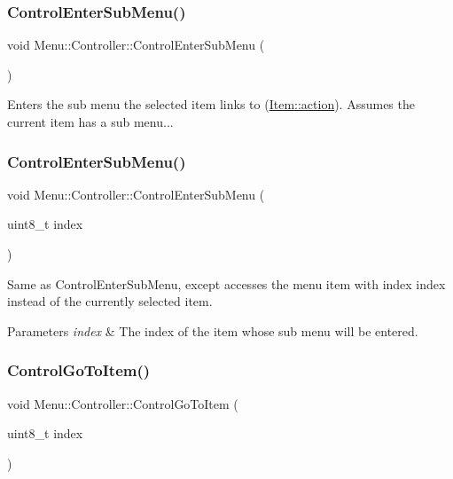 \subsubsection{\texorpdfstring{Control\+Enter\+Sub\+Menu()}{ControlEnterSubMenu()}\hspace{0.1cm}{\footnotesize\ttfamily [1/2]}}
{\footnotesize\ttfamily void Menu\+::\+Controller\+::\+Control\+Enter\+Sub\+Menu (\begin{DoxyParamCaption}{ }\end{DoxyParamCaption})}

Enters the sub menu the selected item links to (\hyperlink{struct_menu_1_1_item_a247e140fed2addf80986ba5a3506b9dd}{Item\+::action}). Assumes the current item has a sub menu... \hypertarget{class_menu_1_1_controller_a8bc1d62574e86a08d5a60652370dd21a}{}\label{class_menu_1_1_controller_a8bc1d62574e86a08d5a60652370dd21a} 
\subsubsection{\texorpdfstring{Control\+Enter\+Sub\+Menu()}{ControlEnterSubMenu()}\hspace{0.1cm}{\footnotesize\ttfamily [2/2]}}
{\footnotesize\ttfamily void Menu\+::\+Controller\+::\+Control\+Enter\+Sub\+Menu (\begin{DoxyParamCaption}\item[{uint8\+\_\+t}]{index }\end{DoxyParamCaption})}

Same as Control\+Enter\+Sub\+Menu, except accesses the menu item with index index instead of the currently selected item. 
\begin{DoxyParams}{Parameters}
{\em index} & The index of the item whose sub menu will be entered. \\
\hline
\end{DoxyParams}
\hypertarget{class_menu_1_1_controller_a0dae623388e9bb9e651385d0ef9a2394}{}\label{class_menu_1_1_controller_a0dae623388e9bb9e651385d0ef9a2394} 
\subsubsection{\texorpdfstring{Control\+Go\+To\+Item()}{ControlGoToItem()}}
{\footnotesize\ttfamily void Menu\+::\+Controller\+::\+Control\+Go\+To\+Item (\begin{DoxyParamCaption}\item[{uint8\+\_\+t}]{index }\end{DoxyParamCaption})}

